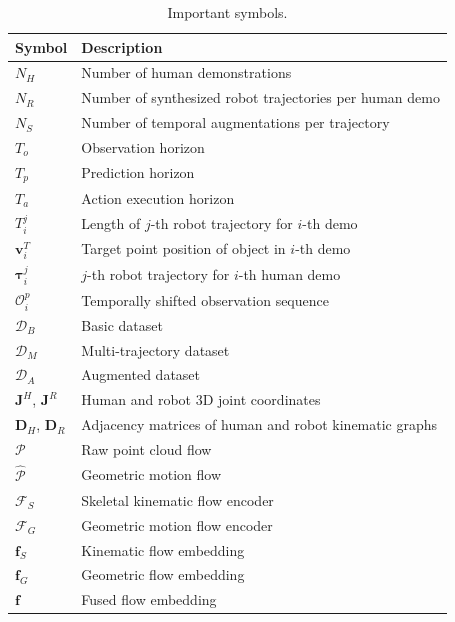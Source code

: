 \documentclass[final,5p,times,twocolumn]{elsarticle}
\begin{document}
\begin{table}[htbp]
\centering
\scriptsize
\caption{Important symbols.}
\label{symbols}
\begin{tabular}{ll}
\toprule
\textbf{Symbol} & \textbf{Description} \\
\midrule
$N_H$                           & Number of human demonstrations \\
$N_R$                           & Number of synthesized robot trajectories per human demo\\
$N_S$                           & Number of temporal augmentations per trajectory \\
$T_o$                           & Observation horizon \\
$T_p$                           & Prediction horizon \\
$T_a$                           & Action execution horizon \\
$T_i^{j}$                       & Length of $j$-th robot trajectory for $i$-th demo \\
$\mathbf{v}_i^T$                & Target point position of object in $i$-th demo \\
$\boldsymbol{\tau}_i^j$         & $j$-th robot trajectory for $i$-th human demo \\
$\mathcal{O}_{i}^{p}$           & Temporally shifted observation sequence \\
$\mathcal{D}_B$                 & Basic dataset \\
$\mathcal{D}_M$                 & Multi-trajectory dataset \\
$\mathcal{D}_A$                 & Augmented dataset \\
$\mathbf{J}^H$, $\mathbf{J}^R$  & Human and robot 3D joint coordinates \\
$\mathbf{D}_H$, $\mathbf{D}_R$  & Adjacency matrices of human and robot kinematic graphs \\
$\mathcal{P}$                   & Raw point cloud flow \\
$\hat{\mathcal{P}}$             & Geometric motion flow \\
$\mathcal{F}_S$                 & Skeletal kinematic flow encoder \\
$\mathcal{F}_G$                 & Geometric motion flow encoder \\
$\bm{f}_S$                      & Kinematic flow embedding \\
$\bm{f}_G$                      & Geometric flow embedding \\
$\bm{f}$                        & Fused flow embedding \\

\end{tabular}
\end{table}
\end{document}
